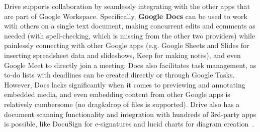 Drive supports collaboration by seamlessly integrating with the other apps that are part of Google Workspace. Specifically, \textbf{Google Docs} can be used to work with others on a single text document, making concurrent edits  and comments as needed (with spell-checking, which is missing from the other two providers) while painlessly connecting with other Google apps (e.g. Google Sheets and Slides for inserting spreadsheet data and slideshows,  Keep for making notes), and even Google Meet to directly join a meeting. Docs also facilitates task management, as to-do lists with deadlines can be created directly or through Google Tasks. However, Docs lacks significantly when it comes to previewing and annotating embedded media, and even embedding content from other Google apps is relatively cumbersome (no drag\&drop of files is supported).  Drive also has a document scanning functionality and integration with hundreds of 3rd-party apps is possible, like DocuSign for e-signatures and lucid charts for diagram creation~\cite{google_drive,google_docs,google_apps}.

